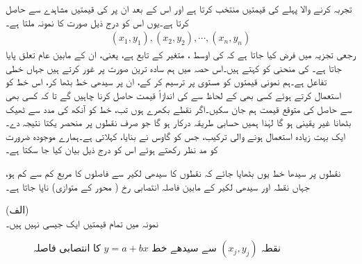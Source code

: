 تجربہ کرنے والا پہلے  کی  قیمتیں  منتخب کرتا ہے اور اس کے بعد ان  پر  کی قیمتیں مشاہدے سے حاصل کرتا ہے۔یوں اس کو درج ذیل صورت کا نمونہ ملتا ہے۔
\begin{align*}
(x_1,y_1), (x_2,y_2),\cdots,(x_n,y_n)
\end{align*} 
رجعی تجزیہ میں فرض کیا جاتا ہے کہ  کی اوسط ، متغیر  کے تابع ہے، یعنی، ان کے مابین عام تعلق  پایا جاتا ہے۔ کی منحنی کو  کہتے ہیں۔اس حصہ میں ہم سادہ ترین صورت پر غور کرتے ہیں جہاں  خطی تفاعل  ہے۔ہم نمونی قیمتوں کو  مستوی پر ترسیم کر کے، ان پر سیدھی خط بٹھا کر، اس خط کو استعمال کرتے ہوئے کسی بھی  کے لحاظ سے  کی اندازاً قیمت حاصل کرنا چاہیں گے تا کہ کسی بھی  سے حاصل  کی متوقع قیمت ہم جان سکیں۔اگر نقطے بکھرے ہوں تب، خط کو آنکھ کی مدد سے ٹھیک بٹھانا غیر یقینی ہو گا لہٰذا ہمیں حسابی طریقہ درکار ہو گا جو صرف نقطوں پر منحصر یکتا نتیجہ دے۔ایک بہت زیادہ استعمال ہونے والی ترکیب، جس کو گاوس نے بنایا،   کہلاتی ہے۔ہمارے موجودہ ضرورت کو مد نظر رکھتے ہوئے اس کو درج ذیل بیان کیا جا سکتا ہے۔

نقطوں پر سیدھا خط یوں بٹھایا جائے کہ نقطوں کا سیدھی لکیر سے فاصلوں کا مربع کم سے کم ہو، جہاں نقطہ اور سیدھی لکیر کے مابین فاصلہ انتصابی رخ ( محور کے متوازی) ناپا جاتا ہے۔ 

 (الف)\\
نمونہ  میں تمام  قیمتیں  ایک جیسی نہیں ہیں۔

\begin{figure}
\centering
{}
\caption{نقطہ $(x_j,y_j)$ سے سیدھے خط $y=a+bx$ کا انتصابی فاصلہ}
\label{شکل_شماریات_خط_بٹھانا_انتصابی_فاصلہ}
\end{figure}

